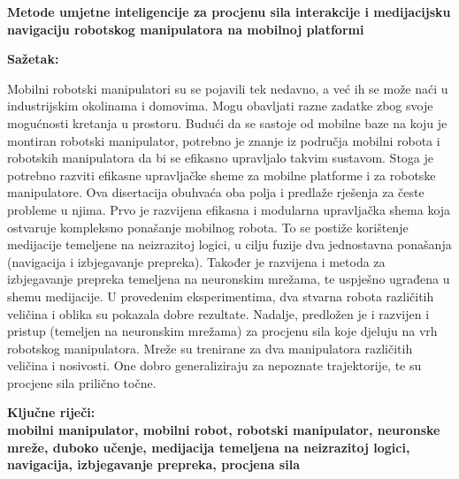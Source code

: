 

\newpage
\setlength{\parindent}{0in}
{\fontsize{14}{18}\bf {Metode umjetne inteligencije za procjenu sila interakcije i medijacijsku navigaciju robotskog manipulatora na mobilnoj platformi}}

\vskip 15mm
\textbf{Sa\v{z}etak:\\}
   
\textnormal{Mobilni robotski manipulatori su se pojavili tek nedavno, a već ih se može naći u industrijskim okolinama i domovima. Mogu obavljati razne zadatke zbog svoje mogućnosti kretanja u prostoru. Budući da se sastoje od mobilne baze na koju je montiran robotski manipulator, potrebno je znanje iz područja mobilni robota i robotskih manipulatora da bi se efikasno upravljalo takvim sustavom. Stoga je potrebno razviti efikasne upravljačke sheme za mobilne platforme i za robotske manipulatore. Ova disertacija obuhvaća oba polja i predlaže rješenja za česte probleme u njima. Prvo je razvijena efikasna i modularna upravljačka shema koja ostvaruje kompleksno ponašanje mobilnog robota. To se postiže korištenje medijacije temeljene na neizrazitoj logici, u cilju fuzije dva jednostavna ponašanja (navigacija i izbjegavanje prepreka). Također je razvijena i metoda za izbjegavanje prepreka temeljena na neuronskim mrežama, te uspješno ugrađena u shemu medijacije. U provedenim eksperimentima, dva stvarna robota različitih veličina i oblika su pokazala dobre rezultate. Nadalje, predložen je i razvijen i pristup (temeljen na neuronskim mrežama) za procjenu sila koje djeluju na vrh robotskog manipulatora. Mreže su trenirane za dva manipulatora različitih veličina i nosivosti. One dobro generaliziraju za nepoznate trajektorije, te su procjene sila prilično točne.}

\vskip 15mm
\bf{Klju\v{c}ne rije\v{c}i:\\}
\textnormal{mobilni manipulator, mobilni robot, robotski manipulator, neuronske mreže, duboko učenje, medijacija temeljena na neizrazitoj logici, navigacija, izbjegavanje prepreka, procjena sila}
